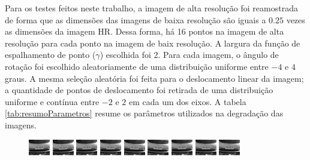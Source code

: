 Para os testes feitos neste trabalho, a imagem de alta resolução foi reamostrada de forma que as dimensões das imagens de baixa resolução são iguais a $0.25$ vezes as dimensões da imagem HR.  
Dessa forma, há 16 pontos na imagem de alta resolução para cada ponto na imagem de baix resolução.
A largura da função de espalhamento de ponto ($\gamma$) escolhida foi 2.
Para cada imagem, o ângulo de rotação foi escolhido aleatoriamente de uma distribuição uniforme entre $-4$ e $4$ graus.
A mesma seleção aleatória foi feita para o deslocamento linear da imagem; a quantidade de pontos de deslocamento foi retirada de uma distribuição uniforme e contínua entre $-2$ e $2$ em cada um dos eixos.
A tabela \ref{tab:resumoParametros} resume os parâmetros utilizados na degradação das imagens.

\begin{figure}[H]
	\centering
	\includegraphics{figures/degradedImg/result-0.png}
	\includegraphics{figures/degradedImg/result-1.png}
	\includegraphics{figures/degradedImg/result-2.png}
	\includegraphics{figures/degradedImg/result-3.png}
	\includegraphics{figures/degradedImg/result-4.png}
	\includegraphics{figures/degradedImg/result-5.png}
	\includegraphics{figures/degradedImg/result-6.png}
	\includegraphics{figures/degradedImg/result-7.png}
	\includegraphics{figures/degradedImg/result-8.png}

\end{figure}
